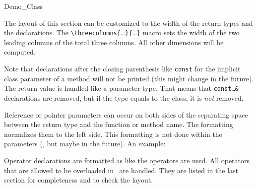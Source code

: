 \documentclass[12pt]{article}
\begin{document}
\begin{class}{Demo_Class}
{  \operations
  \threecolumns{2.8cm}{2.8cm}

The layout of this section can be customized to the width of the
return types and the declarations. The
\verb"\"\verb"threecolumns{"\ldots\verb"}{"\ldots\verb"}" macro sets the
width of the two leading columns of the total three columns. All other
dimensions will be computed.

Note that declarations after the closing parenthesis like {\tt const}
for the implicit class parameter of a method will not be printed
(this might change in the future).
The return value is handled like a parameter type. That means that
{\tt const\ldots\&} declarations are removed, but if the type equals
to the class, it is {\em not} removed.






Reference or pointer parameters can occur on both sides of the
separating space between the return type and the function or method
name. The formatting normalizes them to the left side. This
formatting is not done within the parameters (, but maybe in the
future). An example: 





Operator declarations are formatted as like the operators are
used.  All operators that are allowed to be overloaded in \CC\ are
handled. They are listed in the last section for completeness and
to check the layout. 

}
\end{class}
\end{document}
